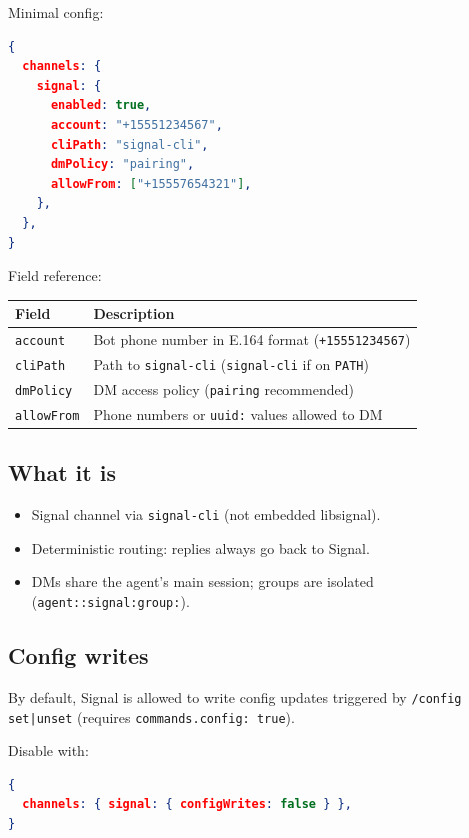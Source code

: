 Minimal config:

\begin{lstlisting}[language=json]
{
  channels: {
    signal: {
      enabled: true,
      account: "+15551234567",
      cliPath: "signal-cli",
      dmPolicy: "pairing",
      allowFrom: ["+15557654321"],
    },
  },
}
\end{lstlisting}


Field reference:


\begin{table}[h]
\centering
\small
\begin{tabular}{|l|l|}
\hline
Field & Description \\
\hline
\texttt{account} & Bot phone number in E.164 format (\texttt{+15551234567}) \\
\hline
\texttt{cliPath} & Path to \texttt{signal-cli} (\texttt{signal-cli} if on \texttt{PATH}) \\
\hline
\texttt{dmPolicy} & DM access policy (\texttt{pairing} recommended) \\
\hline
\texttt{allowFrom} & Phone numbers or \texttt{uuid:} values allowed to DM \\
\hline
\end{tabular}
\end{table}



\subsection{What it is}


\begin{itemize}
  \item Signal channel via \texttt{signal-cli} (not embedded libsignal).
  \item Deterministic routing: replies always go back to Signal.
  \item DMs share the agent's main session; groups are isolated (\texttt{agent::signal:group:}).
\end{itemize}


\subsection{Config writes}


By default, Signal is allowed to write config updates triggered by \texttt{/config set|unset} (requires \texttt{commands.config: true}).

Disable with:

\begin{lstlisting}[language=json]
{
  channels: { signal: { configWrites: false } },
}
\end{lstlisting}


